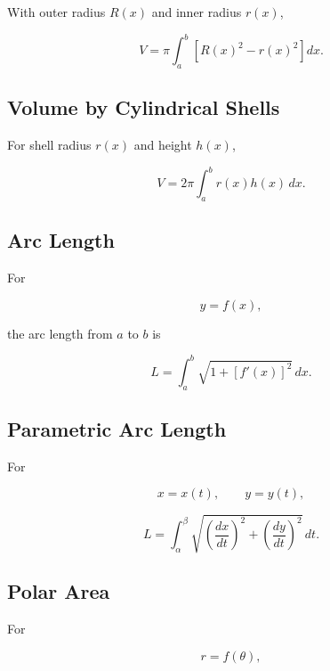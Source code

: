With outer radius \(R(x)\) and inner radius \(r(x)\),

\[
\boxed{
V
=
\pi
\int_a^b
\left[
R(x)^2-r(x)^2
\right]
dx.
}
\]

\subsection{Volume by Cylindrical Shells}
\label{subsec:shell-method-integral-reference}

For shell radius \(r(x)\) and height \(h(x)\),

\[
\boxed{
V
=
2\pi
\int_a^b
r(x)h(x)
\,dx.
}
\]

\subsection{Arc Length}
\label{subsec:arc-length-integral-reference}

For

\[
y=f(x),
\]

the arc length from \(a\) to \(b\) is

\[
\boxed{
L
=
\int_a^b
\sqrt{
1+[f'(x)]^2
}
\,dx.
}
\]

\subsection{Parametric Arc Length}
\label{subsec:parametric-arc-length-integral}

For

\[
x=x(t),
\qquad
y=y(t),
\]

\[
\boxed{
L
=
\int_\alpha^\beta
\sqrt{
\left(
\frac{dx}{dt}
\right)^2
+
\left(
\frac{dy}{dt}
\right)^2
}
\,dt.
}
\]

\subsection{Polar Area}
\label{subsec:polar-area-integral-reference}

For

\[
r=f(\theta),
\]

